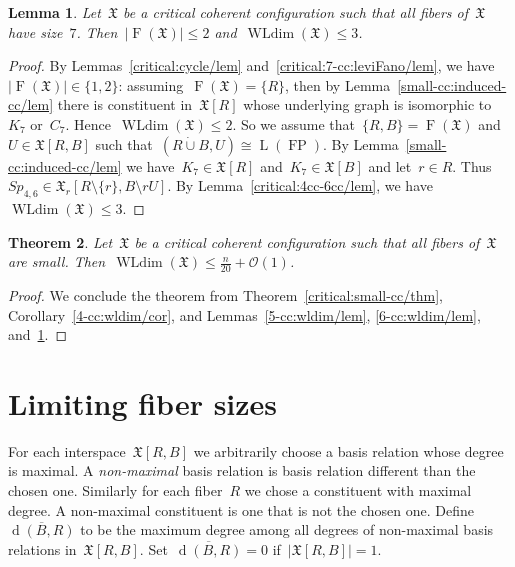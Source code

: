 \documentclass[english,a4paper]{article}
\theoremstyle{plain}
\newtheorem{theorem}             {Theorem}[section]
\newtheorem{lemma}      [theorem]{Lemma}
\theoremstyle{definition}
\newcommand{\abs}[1]{| #1 |}
\newcommand{\disjointUnion}{\ensuremath{\mathbin{\dot{\cup}}}}
\DeclareMathOperator{\Fibers}{F}
\newcommand{\coherentConfig}{\ensuremath{\mathfrak{X}}}
\newcommand{\fibers}[1]{\ensuremath{\Fibers \left( #1 \right)}}
\newcommand{\interspace}[2]{\ensuremath{\coherentConfig[#1,#2]}}
\newcommand{\inducedCC}[1]{\ensuremath{\coherentConfig[#1]}}
\newcommand{\minimalDegree}[2]{\Deg(#1,#2)}
\DeclareMathOperator*{\WLdim}{WLdim}
\newcommand{\wldim}[1]{\ensuremath{\WLdim\left(#1\right)}}
\DeclareMathOperator{\Deg}{d}
\newcommand{\clique}[1]{\ensuremath{K_{#1}}}
\newcommand{\cycle}[1]{\ensuremath{C_{#1}}}
\DeclareMathOperator{\fanoPlane}{FP}
\DeclareMathOperator{\LeviGraph}{L}
\newcommand{\leviGraph}[1]{\ensuremath{\LeviGraph\!\left(#1\right)}}
\newcommand{\leviFano}{\leviGraph{\fanoPlane}}
\newcommand{\interspaceFourSix}{\ensuremath{Sp_{4,6}}}
\begin{document}
\begin{lemma}
\label{7-cc:wldim/lem}
    Let~$\coherentConfig$ be a critical coherent configuration such that all fibers of~$\coherentConfig$ have size~$7$.
    Then~$\abs{\fibers{\coherentConfig}} \leq 2$ and~$\wldim{\coherentConfig} \leq 3$.
\end{lemma}

\begin{proof}
    By Lemmas~\ref{critical:cycle/lem} and~\ref{critical:7-cc:leviFano/lem}, we have~$\abs{\fibers{\coherentConfig}} \in\{1,2\}$:
    assuming~$\fibers{\coherentConfig} = \{R\}$, then by Lemma~\ref{small-cc:induced-cc/lem} there is constituent in~$\inducedCC{R}$ whose underlying graph is isomorphic to~$\clique{7}$ or~$\cycle{7}$.
    Hence~$\wldim{\coherentConfig} \leq 2$.
    So we assume that~$\{R,B\} = \fibers{\coherentConfig}$ and~$U \in \interspace{R}{B}$ such that~$(R \disjointUnion B, U) \cong \leviFano$.
    By Lemma~\ref{small-cc:induced-cc/lem} we have~$\clique{7} \in \inducedCC{R}$ and~$\clique{7} \in \inducedCC{B}$ and let~$r \in R$.
    Thus~$\interspaceFourSix \in \coherentConfig_r[R \setminus \{r\},B \setminus rU]$.
    By Lemma~\ref{critical:4cc-6cc/lem}, we have~$\wldim{\coherentConfig} \leq 3$.
\end{proof}


\begin{theorem}
\label{small-cc:wldim/thm}
    Let~$\coherentConfig$ be a critical coherent configuration such that all fibers of~$\coherentConfig$ are small.
    Then~$\wldim{\coherentConfig} \leq \frac{n}{20} + \mathcal{O}(1)$.
\end{theorem}
\begin{proof}
    We conclude the theorem from Theorem~\ref{critical:small-cc/thm}, Corollary~\ref{4-cc:wldim/cor}, and Lemmas~\ref{5-cc:wldim/lem}, \ref{6-cc:wldim/lem}, and~\ref{7-cc:wldim/lem}.
\end{proof}

     


\section{Limiting fiber sizes}
\label{sec:limit:fiber:sizes}


For each interspace~$\interspace{R}{B}$ we arbitrarily choose a basis relation whose degree is maximal. A \emph{non-maximal} basis relation is basis relation different than the chosen one.
Similarly for each fiber~$R$ we chose a constituent with maximal degree. A non-maximal constituent is one that is not the chosen one. Define~$\overline{\minimalDegree{B}{R}}$ to be the maximum degree among all degrees of non-maximal basis relations in~$\interspace{R}{B}$. Set~$\overline{\minimalDegree{B}{R}}=0$ if~$|\interspace{R}{B}|=1$.
\end{document}

